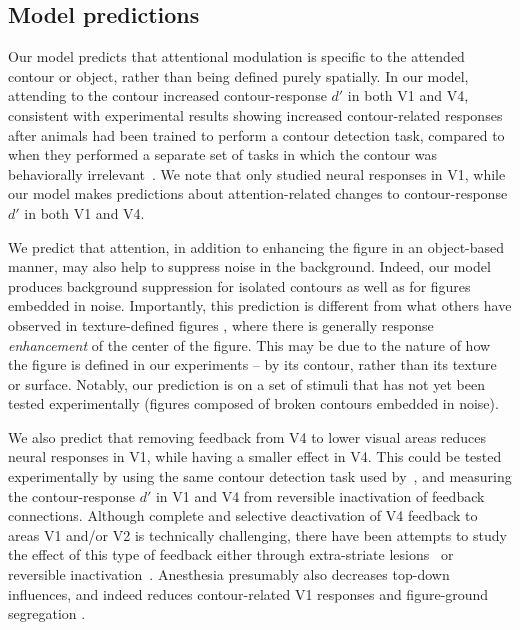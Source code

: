 \subsection{Model predictions}
Our model predicts that attentional modulation is specific to the attended contour or object, rather than being defined purely spatially. In our model, attending to the contour increased contour-response $d'$ in both V1 and V4, consistent with experimental results showing increased contour-related responses after animals had been trained to perform a contour detection task, compared to when they performed a separate set of tasks in which the contour was behaviorally irrelevant~\citep{Li_etal08a}.  We note that \cite{Li_etal08a} only studied neural responses in V1, while our model makes predictions about attention-related changes to contour-response $d'$ in both V1 and V4.

We predict that attention, in addition to enhancing the figure in an
object-based manner, may also help to suppress noise in the background. Indeed, our model produces background suppression for isolated contours as well as for figures embedded in noise. Importantly, this prediction is different from what others have observed in texture-defined figures \citep{Lamme95,Lee_etal98a}, where there is generally response {\em enhancement} of the center of the figure. This may be due to the nature of how the figure is defined in our experiments -- by its contour, rather than its texture or surface. Notably, our prediction is on a set of stimuli that has not yet been tested experimentally (figures composed of broken contours embedded in noise).

We also predict that removing feedback from V4 to lower visual areas reduces neural responses in V1, while having a smaller effect in V4. This could be tested experimentally by using the same contour detection task used by~\cite{Chen_etal14}, and measuring the contour-response $d'$ in V1 and V4 from reversible inactivation of feedback connections. Although complete and selective deactivation of V4 feedback to areas V1 and/or V2 is technically challenging, there have been attempts to study the effect of this type of feedback either through extra-striate lesions~\citep{Super_Lamme07} or reversible inactivation~\citep{Jansen_etal12}. Anesthesia presumably also decreases top-down influences, and indeed reduces contour-related V1 responses \cite{Li_etal08a} and figure-ground segregation \citep{Lamme_etal98}.

